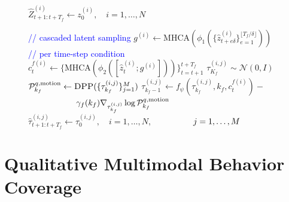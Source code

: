 \documentclass[runningheads]{llncs}
\begin{document}
\begin{figure}[!t]
\begin{minipage}[t]{0.48\textwidth}
\begin{algorithm}[H]
\begin{algorithmic}[1]
\State \label{algline:dpp_res_wm} $\hat Z_{t+1:t+T_f}^{(i)}\gets z_0^{(i)},\quad i=1,\dots,N$ 

\Statex
\Statex \textcolor{blue}{// cascaded latent sampling}
\label{algline:cascade_start}
    \State $g^{(i)}\gets \mathrm{MHCA}(\phi_1(\{\hat z_{t+e\delta}^{(i)}\}_{e=1}^{\lfloor T_f/\delta\rfloor}))$ \label{algline:cascade_g}
    \Statex \hspace{4mm} \textcolor{blue}{// per time-step condition}
    \State $c_t^{f(i)}\gets\{\mathrm{MHCA}(\phi_2([\hat z_t^{(i)};g^{(i)}]))\}_{t=t+1}^{t+T_f}$\label{algline:cascade_c}
        \State $\tau_{K_f}^{(i,j)}\sim\mathcal N(0,I)$
    \EndFor
        \State $\mathcal P_{k_f}^{q,\text{motion}}\gets \textsc{DPP}(\{\tau_{k_f}^{(i,j)}\}_{j=1}^{M})$
            \State $\tau_{k_f-1}^{(i,j)}\gets f_\psi(\tau_{k_f}^{(i,j)},k_f,c_t^{f(i)})-$ \label{algline:cascade_end}
            \Statex $\hspace{20mm}\gamma_f(k_f)\nabla_{\tau_{k_f}^{(i,j)}}\log \mathcal P_{k_f}^{q,\text{motion}}$ 
        \EndFor
    \EndFor
    \State \label{algline:final} $\hat{\tau}_{t+1:t+T_f}^{(i,j)} \gets  \tau_0^{(i,j)},\quad i=1,\dots,N,\;$  
    \Statex $\hspace{15mm} j=1,\dots,M$

\EndFor

\end{algorithmic}
\end{algorithm}
\end{minipage}
\end{figure}


\section{Qualitative Multimodal Behavior Coverage} \label{multimodal_coverage}
\end{document}

